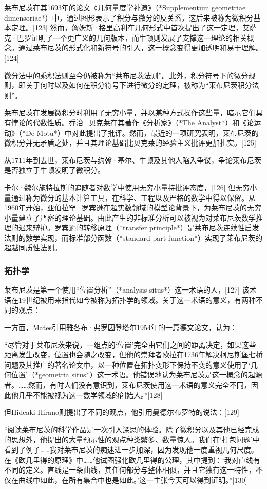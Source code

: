 莱布尼茨在其1693年的论文《几何量度学补遗》（*Supplementum geometriae dimensoriae*）中，通过图形表示了积分与微分的反关系，这后来被称为微积分基本定理。[123] 然而，詹姆斯·格里高利在几何形式中首次提出了这一定理，艾萨克·巴罗证明了一个更广义的几何版本，而牛顿则发展了支撑这一理论的相关概念。通过莱布尼茨的形式化和新符号的引入，这一概念变得更加透明和易于理解。[124]  

微分法中的乘积法则至今仍被称为“莱布尼茨法则”。此外，积分符号下的微分规则，即关于何时以及如何在积分符号下进行微分的定理，被称为“莱布尼茨积分法则”。

莱布尼茨在发展微积分时利用了无穷小量，并以某种方式操作这些量，暗示它们具有悖论的代数性质。乔治·贝克莱在其著作《分析家》（*The Analyst*）和《论运动》（*De Motu*）中对此提出了批评。然而，最近的一项研究表明，莱布尼茨的微积分并无矛盾之处，并且其理论基础比贝克莱的经验主义批评更加扎实。[125]  

从1711年到去世，莱布尼茨与约翰·基尔、牛顿及其他人陷入争议，争论莱布尼茨是否独立于牛顿发明了微积分。

卡尔·魏尔施特拉斯的追随者对数学中使用无穷小量持批评态度，[126] 但无穷小量通过称为微分的基本计算工具，在科学、工程以及严格的数学中得以保留。从1960年开始，亚伯拉罕·罗宾逊在超实数领域的模型论背景下，为莱布尼茨的无穷小量建立了严密的理论基础。由此产生的非标准分析可以被视为对莱布尼茨数学推理的迟来辩护。罗宾逊的转移原理（*transfer principle*）是莱布尼茨连续性启发法则的数学实现，而标准部分函数（*standard part function*）实现了莱布尼茨的超越同质性法则。
\subsubsection{拓扑学}
莱布尼茨是第一个使用“位置分析”（*analysis situs*）这一术语的人，[127] 该术语在19世纪被用来指代如今被称为拓扑学的领域。关于这一术语的意义，有两种不同的观点：

一方面，Mates引用雅各布·弗罗因登塔尔1954年的一篇德文论文，认为：

“尽管对于莱布尼茨来说，一组点的‘位置’完全由它们之间的距离决定，如果这些距离发生改变，位置也会随之改变，但他的崇拜者欧拉在1736年解决柯尼斯堡七桥问题及其推广的著名论文中，以一种位置在拓扑变形下保持不变的意义使用了‘几何位置’（*geometria situs*）这一术语。他错误地认为莱布尼茨是这一概念的起源者。……然而，有时人们没有意识到，莱布尼茨使用这一术语的意义完全不同，因此他几乎不能被视为这一数学领域的创始人。”[128]

但Hideaki Hirano则提出了不同的观点，他引用曼德尔布罗特的说法：[129]

“阅读莱布尼茨的科学作品是一次引人深思的体验。除了微积分以及其他已经完成的思想外，他提出的大量预示性的观点种类繁多、数量惊人。我们在‘打包问题’中看到了例子……我对莱布尼茨的痴迷进一步加深，因为发现他一度重视几何尺度。在《欧几里得的原理》中……他试图强化欧几里得的公理，其中提到：‘我对直线有不同的定义。直线是一条曲线，其任何部分与整体相似，并且它独有这一特性，不仅在曲线中如此，在所有集合中也是如此。’这一主张今天可以得到证明。”[130]

